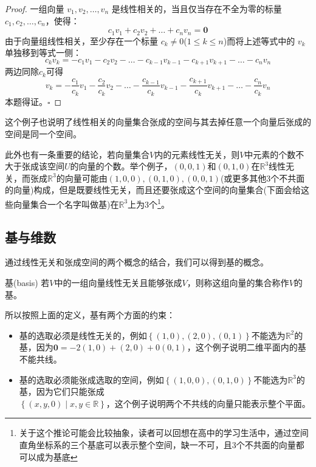 \begin{proof}
	一组向量 $v_1, v_2, \dots, v_n$ 是线性相关的，当且仅当存在不全为零的标量 $c_1, c_2, \dots, c_n$，使得：$$c_1 v_1 + c_2 v_2 + \dots + c_n v_n = \mathbf{0}$$由于向量组线性相关，至少存在一个标量 $c_k \neq 0$($1 \leq k \leq n$)而将上述等式中的 $v_k$ 单独移到等式一侧：$$c_k v_k = -c_1 v_1 - c_2 v_2 - \dots - c_{k-1} v_{k-1} - c_{k+1} v_{k+1} - \dots - c_n v_n$$两边同除$c_k$可得$$v_k = -\frac{c_1}{c_k} v_1 - \frac{c_2}{c_k} v_2 - \dots - \frac{c_{k-1}}{c_k} v_{k-1} - \frac{c_{k+1}}{c_k} v_{k+1} - \dots - \frac{c_n}{c_k} v_n$$本题得证。$\square$
\end{proof}

这个例子也说明了线性相关的向量集合张成的空间与其去掉任意一个向量后张成的空间是同一个空间。

此外也有一条重要的结论，若向量集合$V$内的元素线性无关，则$V$中元素的个数不大于张成该空间$U$的向量的个数。举个例子，$\left( 0,0,1 \right)$和$(0,1,0)$在$\mathbb{R}^3$线性无关，而张成$\mathbb{R}^3$的向量可能由$(1,0,0),(0,1,0),(0,0,1)$(或更多其他3个不共面的向量)构成，但是既要线性无关，而且还要张成这个空间的向量集合(下面会给这些向量集合一个名字叫做基)在$\mathbb{R}^3$上为3个\footnote{关于这个推论可能会比较抽象，读者可以回想在高中的学习生活中，通过空间直角坐标系的三个基底可以表示整个空间，缺一不可，且3个不共面的向量都可以成为基底}。

\subsection{基与维数}

通过线性无关和张成空间的两个概念的结合，我们可以得到基的概念。

\begin{definition}{基(basis)}
	若$V$中的一组向量线性无关且能够张成$V$，则称这组向量的集合称作$V$的基。
\end{definition}

所以按照上面的定义，基有两个方面的约束：
\begin{itemize}
	\item 基的选取必须是线性无关的，例如$\left\{ (1,0),(2,0),(0,1) \right\}$不能选为$\mathbb{R}^2$的基，因为$\boldsymbol{0}=-2(1,0)+(2,0)+0(0,1)$，这个例子说明二维平面内的基不能共线。
	\item 基的选取必须能张成选取的空间，例如$\left\{ (1,0,0),(0,1,0) \right\}$不能选为$\mathbb{R}^3$的基，因为它们只能张成\\$\left\{ (x,y,0)\mid x,y \in \mathbb{R} \right\}$，这个例子说明两个不共线的向量只能表示整个平面。
\end{itemize}

